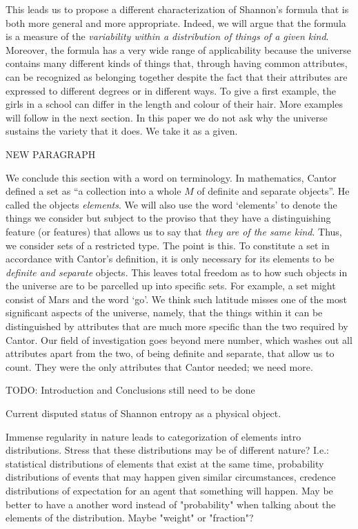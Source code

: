 \documentclass{article}
\begin{document}
This leads us to propose a different characterization of Shannon's formula that is both more general and more appropriate. Indeed, we will argue that the formula is a measure of the \emph{variability within a distribution of things of a given kind}. Moreover, the formula has a very wide range of applicability because the universe contains many different kinds of things that, through having common attributes, can be recognized as belonging together despite the fact that their attributes are expressed to different degrees or in different ways. To give a first example, the girls in a school can differ in the length and colour of their hair. More examples will follow in the next section. In this paper we do not ask why the universe sustains the variety that it does. We take it as a given.

NEW PARAGRAPH

We conclude this section with a word on terminology. In mathematics, Cantor defined a set as ``a collection into a whole $M$ of definite and separate objects''. He called the objects \emph{elements}. We will also use the word `elements' to denote the things we consider but subject to the proviso that they have a distinguishing feature (or features) that allows us to say that \emph{they are of the same kind}. Thus, we consider sets of a restricted type. The point is this. To constitute a set in accordance with Cantor's definition, it is only necessary for its elements to be \emph{definite and separate} objects. This leaves total freedom as to how such objects in the universe are to be parcelled up into specific sets. For example, a set might consist of Mars and the word `go'. We think such latitude misses one of the most significant aspects of the universe, namely, that the things within it can be distinguished by attributes that are much more specific than the two required by Cantor. Our field of investigation goes beyond mere number, which washes out all attributes apart from the two, of being definite and separate, that allow us to count. They were the only attributes that Cantor needed; we need more.



\vspace{.5in}

TODO: Introduction and Conclusions still need to be done

Current disputed status of Shannon entropy as a physical object.

Immense regularity in nature leads to categorization of elements intro distributions. Stress that these distributions may be of different nature? I.e.: statistical distributions of elements that exist at the same time, probability distributions of events that may happen given similar circumstances, credence distributions of expectation for an agent that something will happen. May be better to have a another word instead of "probability" when talking about the elements of the distribution. Maybe "weight" or "fraction"?
\end{document}
